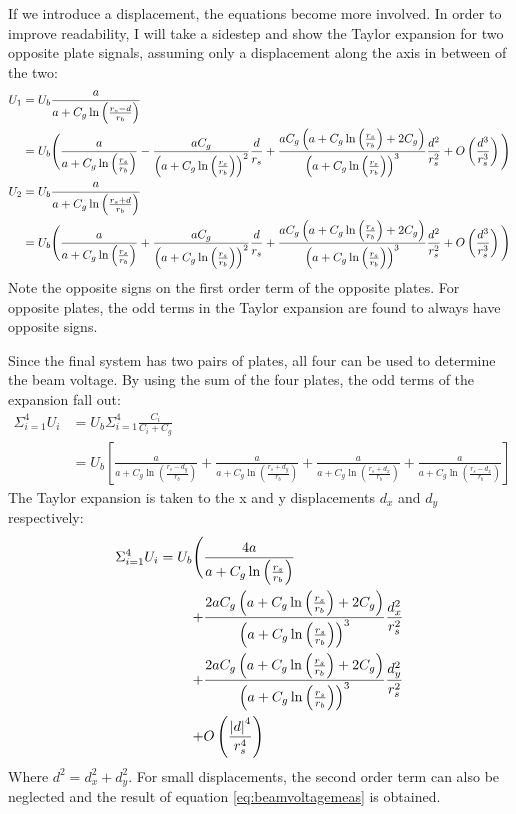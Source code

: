 If we introduce a displacement, the equations become more involved. In order to improve readability, I will take a sidestep and show the Taylor expansion for two opposite plate signals, assuming only a displacement along the axis in between of the two:
\begin{align}
U_1 &= U_b \frac{a}{a+C_g\ln\left(\frac{r_s-d}{r_b}\right)} \nonumber \\
&= U_b \Bigg{(} \frac{a}{a+C_g\ln\left(\frac{r_s}{r_b}\right)} %
- \frac{aC_g}{\left( a+C_g \ln\left(\frac{r_s}{r_b}\right)  \right)^2}\frac{d}{r_s} %
+ \frac{a C_g \left( a + C_g \ln\left( \frac{r_s}{r_b} \right) + 2C_g\right)}{ \left( a+C_g\ln\left(\frac{r_s}{r_b}\right) \right)^3}\frac{d^2}{r_s^2} %
+O\left(\frac{d^3}{r_s^3}\right) \Bigg{)}\\
U_2 &= U_b \frac{a}{a+C_g\ln\left(\frac{r_s+d}{r_b}\right)} \nonumber \\
&= U_b \Bigg{(} \frac{a}{a+C_g\ln\left(\frac{r_s}{r_b}\right)} %
+ \frac{aC_g}{\left( a+C_g \ln\left(\frac{r_s}{r_b}\right)  \right)^2}\frac{d}{r_s} %
+ \frac{a C_g \left( a + C_g \ln\left( \frac{r_s}{r_b} \right) + 2C_g\right)}{ \left( a+C_g\ln\left(\frac{r_s}{r_b}\right) \right)^3}\frac{d^2}{r_s^2} %
+O\left(\frac{d^3}{r_s^3}\right) \Bigg{)}
\end{align}
Note the opposite signs on the first order term of the opposite plates. For opposite plates, the odd terms in the Taylor expansion are found to always have opposite signs.

Since the final system has two pairs of plates, all four can be used to determine the beam voltage. By using the sum of the four plates, the odd terms of the expansion fall out:
\begin{align*}
\Sigma_{i=1}^4 U_i &= U_b \Sigma_{i=1}^4 \frac{C_i}{C_i+C_g} \nonumber\\
&= U_b \left[ \frac{a}{a+C_g\ln\left(\frac{r_s-d_y}{r_b} \right)} + \frac{a}{a+C_g\ln\left(\frac{r_s+d_y}{r_b} \right)} + \frac{a}{a+C_g\ln\left(\frac{r_s+d_x}{r_b} \right)} + \frac{a}{a+C_g\ln\left(\frac{r_s-d_x}{r_b} \right)} \right]
\end{align*}
The Taylor expansion is taken to the x and y displacements $d_x$ and $d_y$ respectively:
\begin{align*}
\Sigma_{i=1}^4 U_i = U_b \Bigg{(}
  &\frac{4a}{a+C_g\ln\left(\frac{r_s}{r_b} \right)} \\
+ &\frac{2aC_g\left(a+C_g\ln\left(\frac{r_s}{r_b} \right) +2C_g \right)}{\left(a+C_g\ln\left(\frac{r_s}{r_b} \right)\right)^3} \frac{d_x^2}{r_s^2} \\
+ &\frac{2aC_g\left(a+C_g\ln\left(\frac{r_s}{r_b} \right) +2C_g \right)}{\left(a+C_g\ln\left(\frac{r_s}{r_b} \right)\right)^3} \frac{d_y^2}{r_s^2} \\
+ &O\left( \frac{\left| d \right| ^4}{r_s^4} \right)
\end{align*}
Where $d^2 = d_x^2 + d_y^2$. For small displacements, the second order term can also be neglected and the result of equation \ref{eq:beamvoltagemeas} is obtained.
